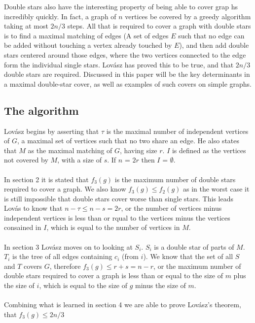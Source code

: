 \documentclass{article}
\begin{document}
	Double stars also have the interesting property of being able to cover grap hs incredibly quickly. In fact, a graph of $n$ vertices be covered by a greedy algorithm taking at most $2n/3$ steps. All that is required to cover a graph with double stars is to find a maximal matching of edges (A set of edges $E$ such that no edge can be added without touching a vertex already touched by $E$), and then add double stars centered around those edges, where the two vertices connected to the edge form the individual single stars. Lov\'asz has proved this to be true, and that $2n/3$ double stars are required. Discussed in this paper will be the key determinants in a maximal double-star cover, as well as examples of such covers on simple graphs.
	\subsection{The algorithm}
	
	Lov\'asz begins by asserting that $\tau$ is the maximal number of independent vertices of $G$, a maximal set of vertices such that no two share an edge. He also states that $M$ as the maximal matching of $G$, having size $r$. $I$ is defined as the vertices not covered by $M$, with a size of $s$. If $n$ = $2r$ then $I$ = $\emptyset$.
	\\\\
	In section 2 it is stated that $f_{3}(g)$ is the maximum number of double stars required to cover a graph. We also know $f_{3}(g) \leq f_{2}(g)$ as in the worst case it is still impossible that double stars cover worse than single stars. This leads Lov\'as to know that $n-\tau \leq n-s = 2r$, or the number of vertices minus independent vertices is less than or rqual to the vertices minus the vertices consained in $I$, which is equal to the number of vertices in $M$.
	\\\\
	In section 3 Lov\'asz moves on to looking at $S_{i}$. $S_{i}$ is a double star of parts of $M$. $T_{i}$ is the tree of all edges containing $c_{i}$ (from $i$). We know that the set of all $S$ and $T$ covers $G$, therefore $f_{3}(g) \leq r + s = n - r$, or the maximum number of double stars required to cover a graph is less than or equal to the size of $m$ plus the size of $i$, which is equal to the size of $g$ minus the size of $m$.
	\\\\
	Combining what is learned in section 4 we are able to prove Lov\'asz's theorem, that $f_{3}(g) \leq 2n/3$
	
\end{document}

